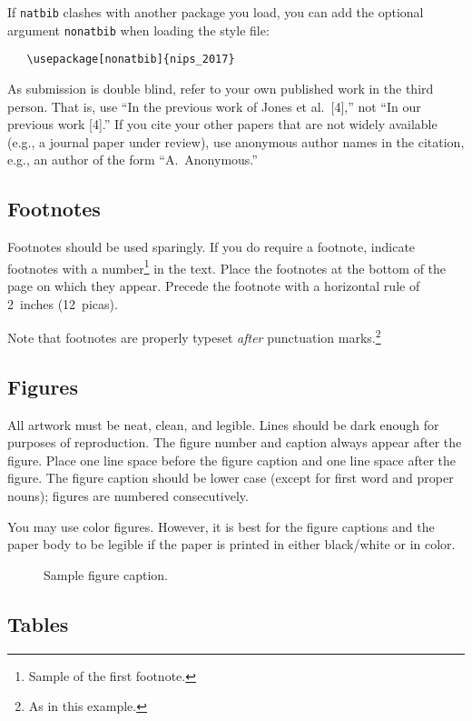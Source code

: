 \documentclass{article}
\begin{document}
If \verb+natbib+ clashes with another package you load, you can add
the optional argument \verb+nonatbib+ when loading the style file:
\begin{verbatim}
   \usepackage[nonatbib]{nips_2017}
\end{verbatim}

As submission is double blind, refer to your own published work in the
third person. That is, use ``In the previous work of Jones et
al.\ [4],'' not ``In our previous work [4].'' If you cite your other
papers that are not widely available (e.g., a journal paper under
review), use anonymous author names in the citation, e.g., an author
of the form ``A.\ Anonymous.''

\subsection{Footnotes}

Footnotes should be used sparingly.  If you do require a footnote,
indicate footnotes with a number\footnote{Sample of the first
  footnote.} in the text. Place the footnotes at the bottom of the
page on which they appear.  Precede the footnote with a horizontal
rule of 2~inches (12~picas).

Note that footnotes are properly typeset \emph{after} punctuation
marks.\footnote{As in this example.}

\subsection{Figures}

All artwork must be neat, clean, and legible. Lines should be dark
enough for purposes of reproduction. The figure number and caption
always appear after the figure. Place one line space before the figure
caption and one line space after the figure. The figure caption should
be lower case (except for first word and proper nouns); figures are
numbered consecutively.

You may use color figures.  However, it is best for the figure
captions and the paper body to be legible if the paper is printed in
either black/white or in color.
\begin{figure}[h]
  \centering
  \fbox{\rule[-.5cm]{0cm}{4cm} \rule[-.5cm]{4cm}{0cm}}
  \caption{Sample figure caption.}
\end{figure}

\subsection{Tables}
\end{document}

